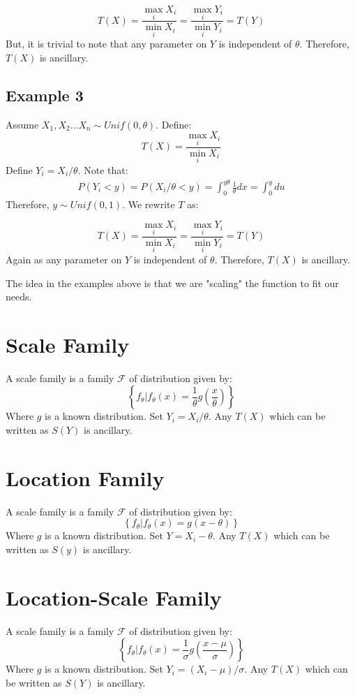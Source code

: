 \documentclass[oneside]{book}
\begin{document}
$$T(X)=\frac{\max_i X_i}{\min_i X_i}=\frac{\max_i Y_i}{\min_i Y_i}=T(Y)$$
But, it is trivial to note that any parameter on $Y$ is independent of $\theta$. Therefore, $T(X)$ is ancillary. 

\subsection{Example 3}
Assume $X_1,X_2\hdots X_n\sim Unif(0,\theta)$. Define:
$$T(X)=\frac{\max_i X_i}{\min_i X_i}$$
Define $Y_i=X_i/\theta$. Note that:
\begin{align*}
    P(Y_i<y)=P(X_i/\theta <y)=\int_0^{y\theta}\frac{1}{\theta}dx=\int_0^y du
\end{align*}
Therefore, $y\sim Unif(0,1)$. We rewrite $T$ as:

$$T(X)=\frac{\max_i X_i}{\min_i X_i}=\frac{\max_i Y_i}{\min_i Y_i}=T(Y)$$
Again as any parameter on $Y$ is independent of $\theta$. Therefore, $T(X)$ is ancillary. 

The idea in the examples above is that we are "scaling" the function to fit our needs. 
\section{Scale Family}
A scale family is a family $\mathcal F$ of distribution given by:
$$\left\{f_\theta|f_\theta(x)=\frac{1}{\theta}g\left(\frac{x}{\theta}\right)\right\}$$
Where $g$ is a known distribution. Set $Y_i=X_i/\theta$. Any $T(X)$ which can be written as $S(Y)$ is ancillary. 

\section{Location Family}
A scale family is a family $\mathcal F$ of distribution given by:
$$\left\{f_\theta|f_\theta(x)=g\left(x-\theta\right)\right\}$$
Where $g$ is a known distribution. Set $Y=X_i-\theta$. Any $T(X)$ which can be written as $S(y)$ is ancillary. 


\section{Location-Scale Family}
A scale family is a family $\mathcal F$ of distribution given by:
$$\left\{f_\theta|f_\theta(x)=\frac{1}{\sigma}g\left(\frac{x-\mu}{\sigma}\right)\right\}$$
Where $g$ is a known distribution. Set $Y_i=(X_i-\mu)/\sigma$. Any $T(X)$ which can be written as $S(Y)$ is ancillary. 
\end{document}
